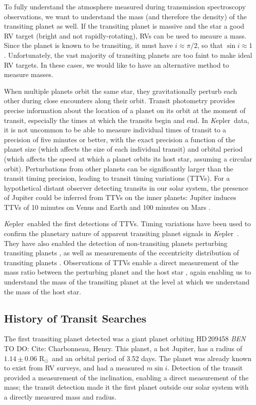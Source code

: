 \documentclass[12pt]{caltech_thesis}
\newcommand{\todo}[3]{{\color{#2} \emph{#1} TO DO: #3}}
\newcommand{\btmtodo}[1]{\todo{BEN}{red}{#1}}
\newcommand{\rsun}{{R$_\odot$}}
\newcommand{\kep}{{\textit Kepler}}
\begin{document}
To fully understand the atmosphere measured during transmission spectroscopy observations,
we want to understand the mass (and therefore the density) of the transiting planet as
well.
If the transiting planet is massive and the star a good RV target (bright and not 
rapidly-rotating), RVs can be used to meaure a mass. 
Since the planet is known to be transiting, it must have $i \approx \pi/2$, so that
$\sin i \approx 1$. 
Unfortunately, the vast majority of transiting planets are too faint to make ideal
RV targets.
In these cases, we would like to have an alternative method to measure masses.

When multiple planets orbit the same star, they gravitationally perturb each other
during close encounters along their orbit.
Transit photometry provides precise information about the location of a planet on its 
orbit at the moment of transit, especially the times at which the transits
begin and end.
In \kep\ data, it is not uncommon to be able to measure individual times of transit to a
precision of five minutes or better, with the exact precision a function of the 
planet size (which affects the size of each individual transit) and orbital period
(which affects the speed at which a planet orbits its host star, assuming a 
circular orbit).
Perturbations from other planets can be significantly larger than the transit timing
precision, leading to transit timing variations (TTVs). 
For a hypothetical distant observer detecting transits in our solar system, the
presence of Jupiter could be inferred from TTVs on the inner planets: 
Jupiter induces TTVs of 10 minutes on Venus and Earth and 100 minutes on Mars
\citep{Agol05, Holman05}.

\kep\ enabled the first detections of TTVs. 
Timing variations have been used to confirm the planetary nature of apparent transiting
planet signals in \kep\ \citep{Holman10, Rowe14}.
They have also enabled the detection of non-transiting planets perturbing transiting
planets \citep[e.g.][]{Ballard11, Nesvorny13}, as well as measurements of the eccentricity 
distribution of transiting planets \citep{Hadden14}.
Observations of TTVs enable a direct measurement of the mass ratio between the
perturbing planet and the host star \citep{Agol05, LithwickWu12},
again enabling us to understand the mass of the transiting planet at the level 
at which we understand the mass of the host star.
 


\subsection{History of Transit Searches}
The first transiting planet detected was a giant planet orbiting HD\,209458 
\btmtodo{Cite: Charbonneau, Henry}. 
This planet, a hot Jupiter, has a radius of $1.14 \pm 0.06$ \rsun\ and an orbital 
period of 3.52 days.
The planet was already known to exist from RV surveys, and had a measured $m \sin i$.
Detection of the transit provided a measurement of the inclination, enabling a 
direct measurement of the mass; the transit detection made it the first planet outside our solar system with a directly measured mass and radius.
\end{document}
